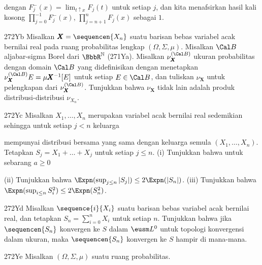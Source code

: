 {

\noindent dengan $F_j^{-}(x)=\lim_{t\uparrow x}F_j(t)$ untuk setiap $j$,
dan kita menafsirkan hasil kali kosong
$\prod_{j=0}^{-1}F_j^{-}(x)$, $\prod_{j=n+1}^nF_j(x)$ sebagai $1$.

\spheader 272Yb
Misalkan $\pmb{X}=\sequencen{X_n}$ suatu barisan bebas variabel acak
bernilai real pada ruang probabilitas lengkap $(\Omega,\Sigma,\mu)$.
Misalkan $\Cal B$ aljabar-sigma Borel dari
$\BbbR^{\Bbb N}$ (271Ya). Misalkan $\nu_{\pmb{X}}^{(\Cal B)}$ ukuran
probabilitas dengan domain $\Cal B$ yang didefinisikan dengan menetapkan
$\nu_{\pmb{X}}^{(\Cal B)}E=\mu\pmb{X}^{-1}[E]$ untuk setiap
$E\in\Cal B$, dan tuliskan $\nu_{\pmb{X}}$ untuk pelengkapan dari
$\nu_{\pmb{X}}^{(\Cal B)}$. Tunjukkan bahwa $\nu_{\pmb{X}}$ tidak lain
adalah produk distribusi-distribusi $\nu_{X_n}$.

\spheader 272Yc
Misalkan $X_1,\ldots,X_n$ merupakan variabel acak bernilai real
sedemikian sehingga untuk setiap $j<n$ keluarga


\noindent mempunyai distribusi bersama yang sama dengan keluarga semula
$(X_1,\ldots,X_n)$. Tetapkan $S_j=X_1+\ldots+X_j$ untuk setiap
$j\le n$. (i) Tunjukkan bahwa untuk sebarang $a\ge 0$


\noindent {}
(ii) Tunjukkan bahwa
$\Expn(\sup_{j\le n}|S_j|)\le 2\Expn(|S_n|)$. (iii)
Tunjukkan bahwa $\Expn(\sup_{i\le n}S_i^2)\le 2\Expn(S_n^2)$.

\spheader 272Yd
Misalkan $\sequence{i}{X_i}$ suatu barisan bebas variabel acak
bernilai real, dan tetapkan $S_n=\sum_{i=0}^nX_i$ untuk setiap $n$.
Tunjukkan bahwa jika $\sequencen{S_n}$ konvergen ke $S$ dalam
$\eusm L^0$ untuk topologi konvergensi dalam ukuran, maka
$\sequencen{S_n}$ konvergen ke $S$ hampir di mana-mana.

\spheader 272Ye
Misalkan $(\Omega,\Sigma,\mu)$ suatu ruang probabilitas.

}
